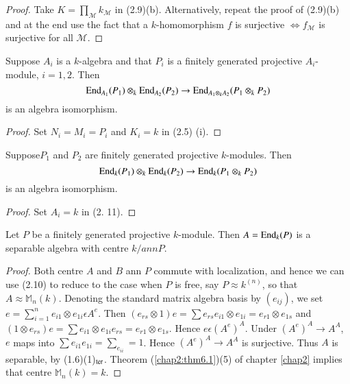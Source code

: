 \begin{proof}%
Take $K = \prod\limits_{\mathscr{M}} k_\mathscr{M}$ in
(2.9)(b). Alternatively, repeat the proof of (2.9)(b) and at the end
use the fact that a $k$-homomorphism $f$ is surjective
$\Leftrightarrow f_{\mathscr{M}}$ is surjective for all $\mathscr{M}$.  
\end{proof}

\begin{coro}%
Suppose $A_i$ is a $k$-algebra and that $P_i$ is a finitely generated
projective $A_i$-module, $i=1, 2$. Then  
$$
\operatorname{End}_{A_1}(P_1) \otimes_k \operatorname{End}_{A_2}(P_2) \to \operatorname{End}_{A_1 \otimes_k 
  A_2}(P_1 \otimes_k P_2) 
$$
is an algebra isomorphism.
\end{coro}

\begin{proof}%
Set $N_i = M_i=P_i$ and $K_i = k$ in (2.5) (i).
\end{proof}

\begin{coro} %
Suppose\pageoriginale $P_1$ and $P_2$ are finitely generated
projective $k$-modules. Then 
$$
\operatorname{End}_k (P_1) \otimes_k \operatorname{End}_k (P_2) \to \operatorname{End}_k (P_1 \otimes_k P_2)
$$
is an algebra isomorphism.
\end{coro}

\begin{proof}%
Set $A_i = k$ in (2. 11).
\end{proof}

\setcounter{prop}{12}
\begin{prop}\label{chap3:prop2.13} %
Let $P$ be a finitely generated projective $k$-module. Then $A= \operatorname{End}_k
(P)$ is a separable algebra with centre $k/ ann P$. 
\end{prop}

\begin{proof}%
Both centre $A$ and $B$ ann $P$ commute with localization, and hence
we can use (2.10) to reduce to the case when $P$ is free, say $P
\approx k^{(n)}$, so that $A \approx \mathbb{M}_n (k)$. Denoting the
standard matrix algebra basis by $(e_{ij})$, we set $e=
\sum\limits^{n}_{i=1} e_{i 1} \otimes e_{1 i} \epsilon A^e$. Then
$(e_{rs} \otimes 1) e = \sum e_{rs}e_{i 1} \otimes e_{1 i} = e_{r 1}
\otimes e_{1 s}$ and $( 1 \otimes e_{rs}) e= \sum e_{i 1} \otimes e_{1i}
   e_{rs} = e_{r1} \otimes e_{1 s}$. Hence $e \epsilon
(A^e)^A$. Under $(A^e)^A \to A^A$, $e$ maps into $\sum e_{i1} e_{1 i}
= \sum_{e_{ii}}=1$. Hence $(A^e)^A \to  A^A$ is surjective. Thus $A$
is separable, by (1.6)(1)$_{\rm ter}$. Theorem (\ref{chap2:thm6.1})(5)
of chapter \ref{chap2} implies that centre $\mathbb{M}_n (k) = k$. 
\end{proof}

